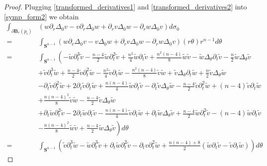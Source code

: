 \documentclass[reqno,11pt]{amsart}
\theoremstyle{tttheorem}
\newcommand{\Ss}{\mathbf{S}}
\newcommand{\B}{\mathbf{B}}
\begin{document}
\begin{proof}
 Plugging \eqref{transformed_derivatives1} and \eqref{transformed_derivatives2}
 into \eqref{symp_form2} we obtain 
 \begin{align*}
   \int_{\partial \B_r(p_i)} & \left(w \partial_r \Delta_0 v - v \partial_r \Delta_0 w + 
 \partial_r v \Delta_0 w - \partial_r w \Delta_0 v\right) d\sigma_0\\  
 = & \int_{\Ss^{n-1}} (w \partial_r \Delta_0 v - v \Delta_0 w + \partial_r v \Delta_0 w - \partial_r w  \Delta_0 v )(r\theta)r^{n-1} d\theta\\
 = &\int_{\Ss^{n-1}} \left ( -\widetilde{w}\partial_t^3 \widetilde{v} - \frac{n-4}{2}  \widetilde{w}
 \partial_t^2 \widetilde{v} + \frac{n^2}{4} \widetilde{w}\partial_t \widetilde{v} + \frac{n^2(n-4)}{8} \widetilde{w}\widetilde{v} 
 - \widetilde{w}\Delta_\theta \partial_t \widetilde{v} - \frac{n}{2} \widetilde{w}\Delta_\theta \widetilde{v}  \right.\\
 & +\widetilde{v}\partial_t^3 \widetilde{w} + \frac{n-4}{2}  \widetilde{v}
 \partial_t^2 \widetilde{w} - \frac{n^2}{4} \widetilde{v}\partial_t \widetilde{w} - \frac{n^2(n-4)}{8} \widetilde{v}\widetilde{w} 
 + \widetilde{v}\Delta_\theta \partial_t \widetilde{w} + \frac{n}{2} \widetilde{v}\Delta_\theta \widetilde{w} \\ 
 &-\partial_t \widetilde{v} \partial_t^2 \widetilde{w} + 2 \partial_t \widetilde{v} 
 \partial_t \widetilde{w} + \frac{n(n-4)}{4} \widetilde{w} \partial_t \widetilde{v} - \partial_t \widetilde{v} 
 \Delta_\theta \widetilde{w}  - \frac{n-4}{2} \widetilde{v} \partial_t^2\widetilde{w} + (n-4)\widetilde{v} 
 \partial_t\widetilde{w}\\
 &+ \frac{n(n-4)^2}{8} \widetilde{v}\widetilde{w} - \frac{n-4}{2} \widetilde{v} \Delta_\theta
 \widetilde{w}\\ 
 &+\partial_t \widetilde{w} \partial_t^2 \widetilde{v} - 2 \partial_t \widetilde{w} 
 \partial_t \widetilde{v} - \frac{n(n-4)}{4} \widetilde{v} \partial_t \widetilde{w} + \partial_t \widetilde{w} 
 \Delta_\theta \widetilde{v}  + \frac{n-4}{2} \widetilde{w} \partial_t^2\widetilde{v} - (n-4)\widetilde{w} 
 \partial_t\widetilde{v}\\
 &\left.- \frac{n(n-4)^2}{8} \widetilde{w}\widetilde{v} + \frac{n-4}{2} \widetilde{w} \Delta_\theta
 \widetilde{v} \right)d\theta\\
 = & \int_{\Ss^{n-1}} \left ( \widetilde{v} \partial_t^3 \widetilde{w} - \widetilde{w} \partial_t^3 \widetilde{v} 
 + \partial_t\widetilde{w} \partial_t^2 \widetilde{v} - \partial_t{v} \partial_t^2\widetilde{w} 
 +\frac{n(n-4)+8}{2} (\widetilde{w}\partial_t \widetilde{v} - \widetilde{v} \partial_t\widetilde{w} 
 )\right ) d\theta
 \end{align*}



\end{proof}
\end{document}
